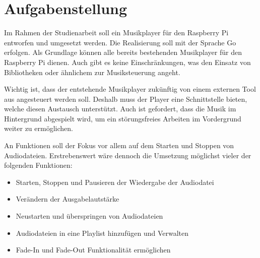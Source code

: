 
\chapter{Aufgabenstellung}

Im Rahmen der Studienarbeit soll ein Musikplayer für den Raspberry Pi entworfen
und umgesetzt werden. Die Realisierung soll mit der Sprache Go erfolgen. Als
Grundlage können alle bereits bestehenden Musikplayer für den Raspberry Pi
dienen. Auch gibt es keine Einschränkungen, was den Einsatz von Bibliotheken
oder ähnlichem zur Musiksteuerung angeht. \hfill \break

Wichtig ist, dass der entstehende Musikplayer zukünftig von einem externen Tool aus
angesteuert werden soll. Deshalb muss der Player eine Schnittstelle bieten,
welche diesen Austausch unterstützt. Auch ist gefordert, dass die Musik im
Hintergrund abgespielt wird, um ein störungsfreies Arbeiten im Vordergrund
weiter zu ermöglichen. \hfill \break

An Funktionen soll der Fokus vor allem auf dem Starten und Stoppen von
Audiodateien. Erstrebenswert wäre dennoch die Umsetzung möglichst vieler der
folgenden Funktionen: 

\begin{itemize}
\item Starten, Stoppen und Pausieren der Wiedergabe der Audiodatei
\item Verändern der Ausgabelautstärke
\item Neustarten und überspringen von Audiodateien
\item Audiodateien in eine Playlist hinzufügen und Verwalten
\item Fade-In und Fade-Out Funktionalität ermöglichen
\end{itemize}

